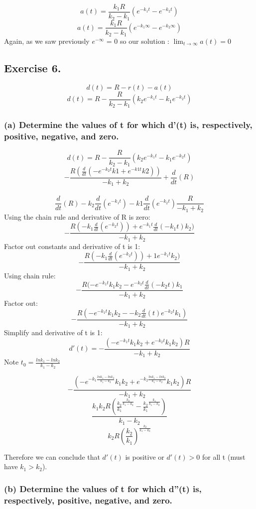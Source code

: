 \documentclass[]{article}
\begin{document}
\[a(t) = \frac{k_1 R}{k_2-k_1}(e^{-k_1t} - e^{-k_2t})\]
\[a(t) = \frac{k_1 R}{k_2-k_1}(e^{-k_1 \infty} - e^{-k_2 \infty})\]
Again, as we saw previously \(e^{-\infty}\) = 0 so our solution :
\(\lim_{t\to\infty}a(t) =0\)

\subsection{Exercise 6.}\label{exercise-6.}

\[d(t) = R - r(t) - a(t)\]
\[d(t) = R - \frac{R}{k_2 - k_1}(k_2 e ^{-k_1 t} - k_1 e^{-k_2 t})\]

\subsubsection{(a) Determine the values of t for which d'(t) is,
respectively, positive, negative, and
zero.}\label{a-determine-the-values-of-t-for-which-dt-is-respectively-positive-negative-and-zero.}

\[d(t) = R - \frac{R}{k_2 - k_1}(k_2 e ^{-k_1 t} - k_1 e^{-k_2 t})\]
\[- \frac{R (\frac{d}{dt} (-e^{-k_2 t} k1 + e^{-k1t}k2))}{-k_1 + k_2} + \frac{d}{dt} (R)\]\\
\[\frac{d}{dt}(R) - k_2 \frac{d}{dt}(e^{-k_1 t})-k1\frac{d}{dt}(e^{-k_2 t})\frac{R}{-k_1 + k_2}\]
Using the chain rule and derivative of R is zero:
\[- \frac{R(-k_1 \frac{d}{dt}(e^{-k_2 t})) + e^{-k_1 t}\frac{d}{dt}(-k_1 t)k_2)}{-k_1 + k_2}\]
Factor out constants and derivative of t is 1:
\[- \frac{R(-k_1 \frac{d}{dt}(e^{-k_2 t})) + 1e^{-k_1 t}k_2)}{-k_1 + k_2}\]
Using chain rule:
\[- \frac{R(-e^{-k_1 t}k_1 k_2 - e^{-k_2 t} \frac{d}{dt} (-k_2 t)k_1}{-k_1 + k_2}\]
Factor out:
\[- \frac{R(-e^{-k_1 t}k_1 k_2 - -k_2 \frac{d}{dt}(t)e^{-k_2 t}k_1)}{-k_1 + k_2}\]
Simplify and derivative of t is 1:
\[d'(t) = -\frac{(-e^{-k_1 t}k_1 k_2 + e^{-k_2 t}k_1 k_2)R}{-k_1 + k_2}\]
Note \(t_0 = \frac{ln k_1 - ln k_2}{k_1 - k_2}\)

\[-\frac{(-e^{-k_1 \frac{ln k_1 - ln k_2}{k_1 - k_2}}k_1 k_2 + e^{-k_2 \frac{ln k_1 - ln k_2}{k_1 - k_2}}k_1 k_2)R}{-k_1 + k_2}\]
\[\frac{k_1 k_2 R (\frac{k_2}{k_1}^{\frac{k_2}{k_1 - k_2}}-\frac{k_2}{k_1}^{\frac{k_1}{k_1 - k_2}})}{k_1 - k_2}\]
\[k_2R(\frac{k_2}{k_1})^{\frac{k_2}{k_1 - k_2}}\]

Therefore we can conclude that \(d'(t)\) is positive or \(d'(t) > 0\)
for all t (must have \(k_1 > k_2\)).

\subsubsection{(b) Determine the values of t for which d''(t) is,
respectively, positive, negative, and
zero.}\label{b-determine-the-values-of-t-for-which-dt-is-respectively-positive-negative-and-zero.}
\end{document}
